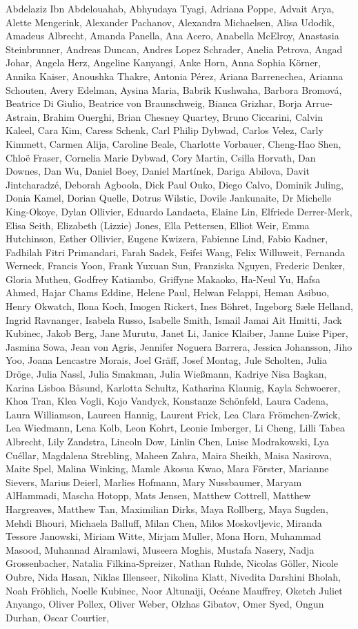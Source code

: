 \documentclass[]{article}
\begin{document}
Abdelaziz Ibn Abdelouahab, Abhyudaya Tyagi, Adriana Poppe, Advait Arya, Alette Mengerink, Alexander Pachanov, Alexandra Michaelsen, Alisa Udodik, Amadeus Albrecht, Amanda Panella, Ana Acero, Anabella McElroy, Anastasia Steinbrunner, Andreas Duncan, Andres Lopez Schrader, Anelia Petrova, Angad Johar, Angela Herz, Angeline Kanyangi, Anke Horn, Anna Sophia Körner, Annika Kaiser, Anoushka Thakre, Antonia Pérez, Ariana Barrenechea, Arianna Schouten, Avery Edelman, Aysina Maria, Babrik Kushwaha, Barbora Bromová, Beatrice Di Giulio, Beatrice von Braunschweig, Bianca Grizhar, Borja Arrue-Astrain, Brahim Ouerghi, Brian Chesney Quartey, Bruno Ciccarini, Calvin Kaleel, Cara Kim, Caress Schenk, Carl Philip Dybwad, Carlos Velez, Carly Kimmett, Carmen Alija, Caroline Beale, Charlotte Vorbauer, Cheng-Hao Shen, Chloë Fraser, Cornelia Marie Dybwad, Cory Martin, Csilla Horvath, Dan Downes, Dan Wu, Daniel Boey, Daniel Martínek, Dariga Abilova, Davit Jintcharadzé, Deborah Agboola, Dick Paul Ouko, Diego Calvo, Dominik Juling, Donia Kamel, Dorian Quelle, Dotrus Wilstic, Dovile Jankunaite, Dr Michelle King-Okoye, Dylan Ollivier, Eduardo Landaeta, Elaine Lin, Elfriede Derrer-Merk, Elisa Seith, Elizabeth (Lizzie) Jones, Ella Pettersen, Elliot Weir, Emma Hutchinson, Esther Ollivier, Eugene Kwizera, Fabienne Lind, Fabio Kadner, Fadhilah Fitri Primandari, Farah Sadek, Feifei Wang, Felix Willuweit, Fernanda Werneck, Francis Yoon, Frank Yuxuan Sun, Franziska Nguyen, Frederic Denker, Gloria Mutheu, Godfrey Katiambo, Griffyne Makaoko, Ha-Neul Yu, Hafsa Ahmed, Hajar Chams Eddine, Helene Paul, Helwan Felappi, Heman Asibuo, Henry Okwatch, Ilona Koch, Imogen Rickert, Ines Böhret, Ingeborg Sæle Helland, Ingrid Ravnanger, Isabela Russo, Isabelle Smith, Ismail Jamai Ait Hmitti, Jack Kubinec, Jakob Berg, Jane Murutu, Janet Li, Janice Klaiber, Janne Luise Piper, Jasmina Sowa, Jean von Agris, Jennifer Noguera Barrera, Jessica Johansson, Jiho Yoo, Joana Lencastre Morais, Joel Gräff, Josef Montag, Jule Scholten, Julia Dröge, Julia Nassl, Julia Smakman, Julia Wießmann, Kadriye Nisa Başkan, Karina Lisboa Båsund, Karlotta Schultz, Katharina Klaunig, Kayla Schwoerer, Khoa Tran, Klea Vogli, Kojo Vandyck, Konstanze Schönfeld, Laura Cadena, Laura Williamson, Laureen Hannig, Laurent Frick, Lea Clara Frömchen-Zwick, Lea Wiedmann, Lena Kolb, Leon Kohrt, Leonie Imberger, Li Cheng, Lilli Tabea Albrecht, Lily Zandstra, Lincoln Dow, Linlin Chen, Luise Modrakowski, Lya Cuéllar, Magdalena Strebling, Maheen Zahra, Maira Sheikh, Maisa Nasirova, Maite Spel, Malina Winking, Mamle Akosua Kwao, Mara Förster, Marianne Sievers, Marius Deierl, Marlies Hofmann, Mary Nussbaumer, Maryam AlHammadi, Mascha Hotopp, Mats Jensen, Matthew Cottrell, Matthew Hargreaves, Matthew Tan, Maximilian Dirks, Maya Rollberg, Maya Sugden, Mehdi Bhouri, Michaela Balluff, Milan Chen, Milos Moskovljevic, Miranda Tessore Janowski, Miriam Witte, Mirjam Muller, Mona Horn, Muhammad Masood, Muhannad Alramlawi, Museera Moghis, Mustafa Nasery, Nadja Grossenbacher, Natalia Filkina-Spreizer, Nathan Ruhde, Nicolas Göller, Nicole Oubre, Nida Hasan, Niklas Illenseer, Nikolina Klatt, Nivedita Darshini Bholah, Noah Fröhlich, Noelle Kubinec, Noor Altunaiji, Océane Mauffrey, Oketch Juliet Anyango, Oliver Pollex, Oliver Weber, Olzhas Gibatov, Omer Syed, Ongun Durhan, Oscar Courtier, 
\end{document}
